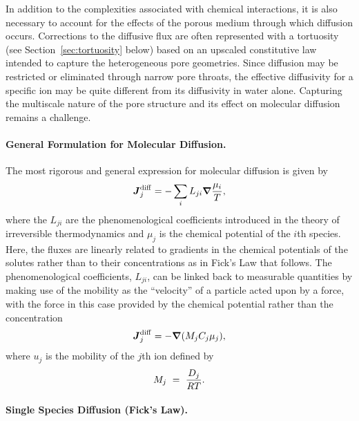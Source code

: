 \noindent In addition to the complexities associated with chemical interactions, it is also necessary to account for the effects of the porous medium through which diffusion occurs.  Corrections to the diffusive flux are often represented with a tortuosity (see Section~\ref{sec:tortuosity} below) based on an upscaled constitutive law intended to capture the heterogeneous pore geometries.  Since diffusion may be restricted or eliminated through narrow pore throats, the effective diffusivity for a specific ion may be quite different from its diffusivity in water alone.  Capturing the multiscale nature of the pore structure and its effect on molecular diffusion remains a challenge.



\paragraph{General Formulation for Molecular Diffusion.}

The most rigorous and general expression for molecular diffusion is given by
\begin{equation} \label{eq:OnsagerReciprocal} 
  \boldsymbol{J}_{j}^{\rm diff} =-\sum_{i}{L_{ji}\boldsymbol{\nabla}\frac{\mu _{i}}{T}},
\end{equation} 
where the $L_{ji}$ are the phenomenological coefficients introduced in
the theory of irreversible thermodynamics
\citep{onsager1931reciprocal,prigogine1968introduction,lasaga1998kinetic}
and $\mu_j$ is the chemical potential of the $i$th species.  Here, the
fluxes are linearly related to gradients in the chemical potentials of
the solutes rather than to their concentrations as in Fick's Law that
follows.  The phenomenological coefficients, $L_{ji}$, can be linked
back to measurable quantities by making use of the mobility as the
``velocity'' of a particle acted upon by a force, with the force in
this case provided by the chemical potential rather than the
concentration
\begin{equation} \label{eq:ChemicalPotentialGradient)} 
  \boldsymbol{J}_{j}^{\rm diff} =-\boldsymbol{\nabla} ( M_{j} C_{j} \mu _{j}), 
\end{equation} 
where $u_{j}$ is the mobility of the $j$th ion defined by
\begin{equation} \label{eq:IonMobility} 
  M_{j} \ =\  \frac{D_j}{RT}.
\end{equation} 



\paragraph{Single Species Diffusion (Fick's Law).}

